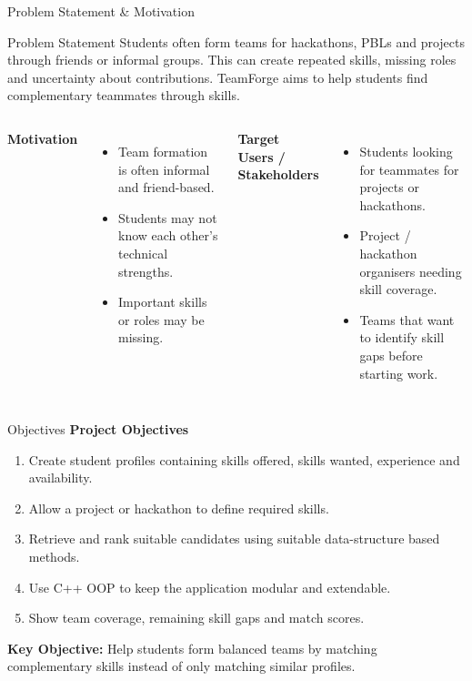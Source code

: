 \documentclass[aspectratio=169,11pt]{beamer}
\begin{document}
\begin{frame}{Problem Statement \& Motivation}
\small
\begin{block}{Problem Statement}
Students often form teams for hackathons, PBLs and projects through friends or informal groups. This can create repeated skills, missing roles and uncertainty about contributions. TeamForge aims to help students find complementary teammates through skills.
\end{block}
\vspace{1mm}
\begin{columns}[T,totalwidth=\textwidth]
\textbf{\color{GEUBlue}Motivation}
\begin{itemize}\setlength{\itemsep}{0pt}
\item Team formation is often informal and friend-based.
\item Students may not know each other's technical strengths.
\item Important skills or roles may be missing.
\end{itemize}
\textbf{\color{GEUBlue}Target Users / Stakeholders}
\begin{itemize}\setlength{\itemsep}{0pt}
\item Students looking for teammates for projects or hackathons.
\item Project / hackathon organisers needing skill coverage.
\item Teams that want to identify skill gaps before starting work.
\end{itemize}
\end{columns}
\end{frame}

\begin{frame}{Objectives}
\textbf{\color{GEUBlue}Project Objectives}
\vspace{2mm}
\begin{enumerate}\setlength{\itemsep}{5pt}
\item Create student profiles containing skills offered, skills wanted, experience and availability.
\item Allow a project or hackathon to define required skills.
\item Retrieve and rank suitable candidates using suitable data-structure based methods.
\item Use C++ OOP to keep the application modular and extendable.
\item Show team coverage, remaining skill gaps and match scores.
\end{enumerate}
\vfill
\begin{center}
\colorbox{GEULightBlue}{\parbox{.80\textwidth}{\centering
\textbf{Key Objective:} Help students form balanced teams by matching complementary skills instead of only matching similar profiles.}}
\end{center}
\end{frame}
\end{document}
